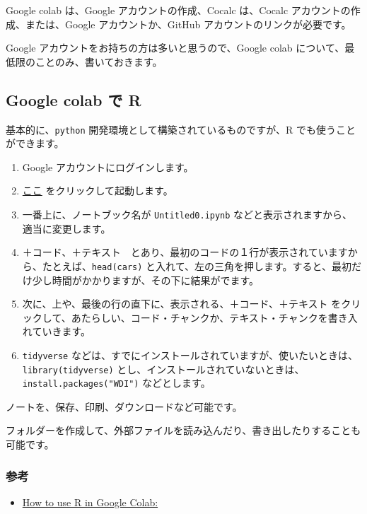 \documentclass[
  xelatex, ja=standard]{bxjsbook}
\providecommand{\tightlist}{%
  \setlength{\itemsep}{0pt}\setlength{\parskip}{0pt}}
\theoremstyle{definition}
\theoremstyle{definition}
\theoremstyle{definition}
\theoremstyle{definition}
\theoremstyle{remark}
\begin{document}
Google colab は、Google アカウントの作成、Cocalc は、Cocalc アカウントの作成、または、Google アカウントか、GitHub アカウントのリンクが必要です。

Google アカウントをお持ちの方は多いと思うので、Google colab について、最低限のことのみ、書いておきます。

\hypertarget{google-colab-ux3067-r}{%
\subsection{Google colab で R}\label{google-colab-ux3067-r}}

基本的に、\texttt{python} 開発環境として構築されているものですが、R でも使うことができます。

\begin{enumerate}
\def\labelenumi{\arabic{enumi}.}
\tightlist
\item
  Google アカウントにログインします。
\item
  \href{https://colab.research.google.com/\#create=true\&language=r}{ここ} をクリックして起動します。
\item
  一番上に、ノートブック名が \texttt{Untitled0.ipynb} などと表示されますから、適当に変更します。
\item
  ＋コード、＋テキスト　とあり、最初のコードの１行が表示されていますから、たとえば、\texttt{head(cars)} と入れて、左の三角を押します。すると、最初だけ少し時間がかかりますが、その下に結果がでます。
\item
  次に、上や、最後の行の直下に、表示される、＋コード、＋テキスト をクリックして、あたらしい、コード・チャンクか、テキスト・チャンクを書き入れていきます。
\item
  \texttt{tidyverse} などは、すでにインストールされていますが、使いたいときは、\texttt{library(tidyverse)} とし、インストールされていないときは、\texttt{install.packages("WDI")} などとします。
\end{enumerate}

ノートを、保存、印刷、ダウンロードなど可能です。

フォルダーを作成して、外部ファイルを読み込んだり、書き出したりすることも可能です。

\hypertarget{ux53c2ux8003-2}{%
\subsubsection{参考}\label{ux53c2ux8003-2}}

\begin{itemize}
\tightlist
\item
  \href{https://towardsdatascience.com/how-to-use-r-in-google-colab-b6e02d736497}{How to use R in Google Colab:}
\end{itemize}
\end{document}
